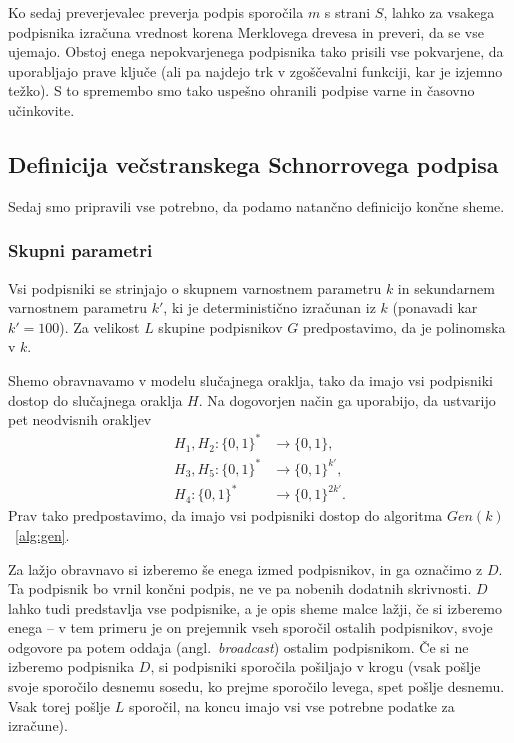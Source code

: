 \documentclass[isrm2, tisk]{fmfdelo}
\begin{document}
Ko sedaj preverjevalec preverja podpis sporočila $m$ s strani $S$, lahko za vsakega podpisnika 
izračuna vrednost korena Merklovega drevesa in preveri, da se vse ujemajo. Obstoj enega nepokvarjenega
podpisnika tako prisili vse pokvarjene, da uporabljajo prave ključe (ali pa najdejo trk v 
zgoščevalni funkciji, kar je izjemno težko). S to spremembo smo tako uspešno ohranili podpise 
varne in časovno učinkovite.

\subsection{Definicija večstranskega Schnorrovega podpisa}
\label{sec:def_multi_schnorr}
Sedaj smo pripravili vse potrebno, da podamo natančno definicijo končne sheme. 

\subsubsection{Skupni parametri}
Vsi podpisniki se strinjajo o skupnem varnostnem parametru $k$ in sekundarnem varnostnem parametru
$k'$, ki je deterministično izračunan iz $k$ (ponavadi kar $k' = 100$). Za velikost $L$ skupine podpisnikov
$G$ predpostavimo, da je polinomska v $k$.

Shemo obravnavamo v modelu slučajnega oraklja, tako da imajo vsi podpisniki dostop do slučajnega
oraklja $H$. Na dogovorjen način ga uporabijo, da ustvarijo pet neodvisnih orakljev
\begin{align*}
    H_1, H_2: \{0, 1\}^* &\rightarrow \{0, 1\}, \\
    H_3, H_5: \{0, 1\}^* &\rightarrow \{0, 1\}^{k'}, \\
    H_4: \{0, 1\}^* &\rightarrow \{0, 1\}^{2k'}.
\end{align*}
Prav tako predpostavimo, da imajo vsi podpisniki dostop do algoritma $Gen(k)$~\ref{alg:gen}.

Za lažjo obravnavo si izberemo še enega izmed podpisnikov, in ga označimo z $D$. Ta podpisnik bo 
vrnil končni podpis, ne ve pa nobenih dodatnih skrivnosti. $D$ lahko tudi predstavlja vse podpisnike, 
a je opis sheme malce lažji, če si izberemo enega -- v tem primeru je on prejemnik vseh sporočil
ostalih podpisnikov, svoje odgovore pa potem oddaja (angl.\ \textit{broadcast}) ostalim podpisnikom.
Če si ne izberemo podpisnika $D$, si podpisniki sporočila pošiljajo v krogu (vsak pošlje svoje sporočilo
desnemu sosedu, ko prejme sporočilo levega, spet pošlje desnemu. Vsak torej pošlje $L$ sporočil, na
koncu imajo vsi vse potrebne podatke za izračune).
\end{document}
